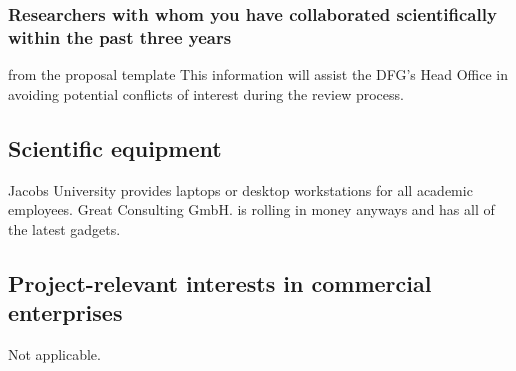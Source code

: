 \subsubsection{Researchers with whom you have collaborated scientifically within the past three years }


\begin{todo}{from the proposal template}
This information will assist the DFG’s Head Office in avoiding potential conflicts of interest during the review process.
\end{todo}


\subsection{Scientific equipment }

Jacobs University provides laptops or desktop workstations for all academic
employees. Great Consulting GmbH. is rolling in money anyways and has all of the latest
gadgets.


\subsection{Project-relevant interests in commercial enterprises }

Not applicable.


